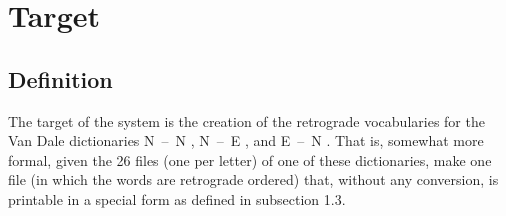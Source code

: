 
   \RosDate{\today}
   \RosSupersedes{-}
   \MakeRosTitle
%
%
\setlength{\parskip}{2mm}
\setlength{\parindent}{0mm}

\section{Target}
\subsection{Definition}
The target of the system is the creation of the retrograde vocabularies for
the Van Dale dictionaries N~--~N \cite{st:groot}, N~--~E \cite{ma:groot1}, 
and E~--~N \cite{ma:groot2}. That is, somewhat more formal, given the 26 files 
(one per letter) of one of these dictionaries, make one file (in which the 
words are retrograde ordered) that, without any conversion, is printable in 
a special form as defined in subsection 1.3.

